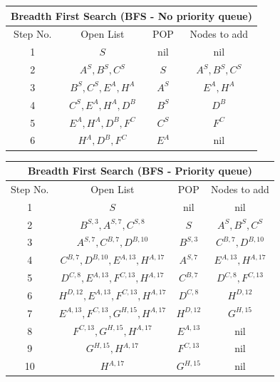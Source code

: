 \documentclass[12pt, letterpaper]{article}
\begin{document}
\begin{center}
    \begin{tabular}{|c|c|c|c|}
    \hline
    \multicolumn{4}{|c|}{Breadth First Search (\textbf{BFS} - No priority queue)}\\
    \hline
    Step No. & Open List & POP & Nodes to add \\ 
    \hline
    1 & $S$ & nil & nil \\
    \hline
    2 & $A^S, B^S, C^S$ & $S$ & $A^S, B^S, C^S$ \\
    \hline
    3 & $B^S, C^S, E^A, H^A$ & $A^S$ & $E^A,H^A$ \\
    \hline
    4 & $C^S, E^A, H^A, D^B$ & $B^S$ & $D^B$\\
    \hline
    5 & $E^A,H^A,D^B,F^C$ & $C^S$ & $F^C$ \\
    \hline
    6 & $H^A,D^B,F^C$ & $E^A$ & nil \\
    \hline
    \end{tabular}
\end{center}

\begin{center}
    \begin{tabular}{|c|c|c|c|}
    \hline
    \multicolumn{4}{|c|}{Breadth First Search (\textbf{BFS} - Priority queue)}\\
    \hline
    Step No. & Open List & POP & Nodes to add \\ 
    \hline
    1 & $S$ & nil & nil \\
    \hline
    2 & $B^{S,3}, A^{S,7}, C^{S,8}$ & $S$ & $A^S, B^S, C^S$ \\
    \hline
    3 & $A^{S,7}, C^{B,7}, D^{B,10}$ & $B^{S,3}$ & $C^{B,7},D^{B,10}$ \\
    \hline
    4 & $C^{B,7}, D^{B,10}, E^{A,13}, H^{A,17}$ & $A^{S,7}$ & $E^{A,13}, H^{A,17}$\\
    \hline
    5 & $D^{C,8}, E^{A,13}, F^{C,13}, H^{A,17}$ & $C^{B,7}$ & $D^{C,8}, F^{C,13}$\\
    \hline
    6 & $H^{D,12}, E^{A,13}, F^{C,13}, H^{A,17}$ & $D^{C,8}$ & $H^{D,12}$\\
    \hline
    7 & $E^{A,13}, F^{C,13}, G^{H,15}, H^{A,17}$ & $H^{D,12}$ & $G^{H,15}$\\
    \hline
    8 & $F^{C,13}, G^{H,15}, H^{A,17}$ & $E^{A,13}$ & nil\\
    \hline
    9 & $G^{H,15}, H^{A,17}$ & $F^{C,13}$ & nil\\
    \hline
    10 & $H^{A,17}$ & $G^{H,15}$ & nil\\
    \hline
    \end{tabular}
\end{center}
\end{document}
